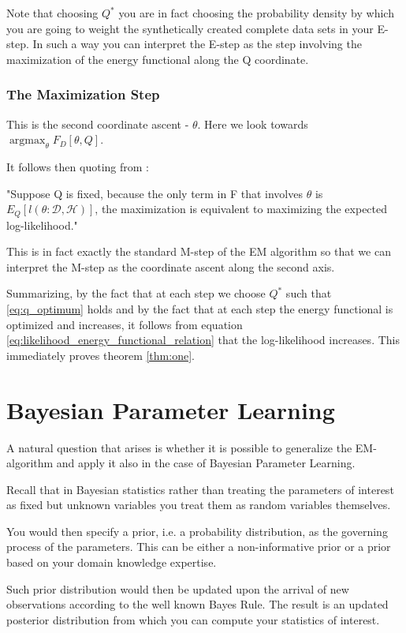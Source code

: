 \documentclass[11pt]{article}
\begin{document}
\begin{article}
Note that choosing \(Q^*\) you are in fact choosing the probability
density by which you are going to weight the synthetically created
complete data sets in your E-step. In such a way you can interpret
the E-step as the step involving the maximization of the energy
functional along the Q coordinate.

\subsubsection{The Maximization Step}
\label{sec:org29d22bf}

This is the second coordinate ascent - \(\theta\). Here we look
towards \(\operatorname*{argmax}_{\theta} F_D[\theta, Q]\).

It follows then quoting from
\cite{koller2009probabilistic}:

"Suppose Q is fixed, because the only term in F that involves \(\theta\) is
\(E_Q[l (\theta: \mathcal{D}, \mathcal{H})]\), the maximization is
equivalent to maximizing the expected log-likelihood."

This is in fact exactly the standard M-step of the EM algorithm so
that we can interpret the M-step as the coordinate ascent along
the second axis. 

Summarizing, by the fact that at each step we choose \(Q^*\) such
that \ref{eq:q_optimum} holds and by the fact that at each step the
energy functional is optimized and increases, it follows from
equation \ref{eq:likelihood_energy_functional_relation} that the
log-likelihood increases. This immediately proves theorem
\ref{thm:one}.

\newpage

\section{Bayesian Parameter Learning}
\label{bayes-parameter-learning}
A natural question that arises is whether it is possible to
generalize the EM-algorithm and apply it also in the case of
Bayesian Parameter Learning.

Recall that in Bayesian statistics rather than treating the
parameters of interest as fixed but unknown variables you treat
them as random variables themselves.

You would then specify a prior, i.e. a probability distribution, as
the governing process of the parameters. This can be either a
non-informative prior or a prior based on your domain knowledge
expertise.

Such prior distribution would then be updated upon the arrival of
new observations according to the well known Bayes Rule. The result
is an updated posterior distribution from which you can compute your
statistics of interest.



\end{article}
\end{document}
